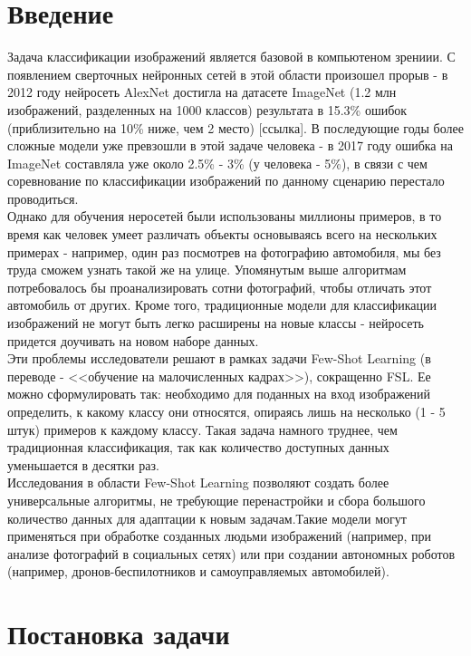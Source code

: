 \documentclass[a4paper, 12pt]{report}
\begin{document}
	\tableofcontents

\chapter{Введение}

Задача классификации изображений является базовой в компьютеном зрениии. С появлением сверточных нейронных сетей в этой области произошел прорыв - в 2012 году нейросеть AlexNet достигла на датасете ImageNet (1.2 млн изображений, разделенных на 1000 классов) результата в 15.3\% ошибок (приблизительно на 10\% ниже, чем 2 место) [ссылка]. В последующие годы более сложные модели уже превзошли в этой задаче человека - в 2017 году ошибка на ImageNet составляла уже около 2.5\% - 3\% (у человека - 5\%), в связи с чем соревнование по классификации изображений по данному сценарию перестало проводиться. \\

Однако для обучения неросетей были использованы миллионы примеров, в то время как человек умеет различать объекты основываясь всего на нескольких примерах - например, один раз посмотрев на фотографию автомобиля, мы без труда сможем узнать такой же на улице. Упомянутым выше алгоритмам потребовалось бы проанализировать сотни фотографий, чтобы отличать этот автомобиль от других. Кроме того, традиционные модели для классификации изображений не могут быть легко расширены на новые классы - нейросеть придется доучивать на новом наборе данных. \\

Эти проблемы исследователи решают в рамках задачи Few-Shot Learning (в переводе - <<обучение на малочисленных кадрах>>), сокращенно FSL. Ее можно сформулировать так: необходимо для поданных на вход изображений определить, к какому классу они относятся, опираясь лишь на несколько (1 - 5 штук) примеров к каждому классу. Такая задача намного труднее, чем традиционная классификация, так как количество доступных данных уменьшается в десятки раз. \\

Исследования в области Few-Shot Learning позволяют создать более универсальные алгоритмы, не требующие перенастройки и сбора большого количество данных для адаптации к новым задачам.Такие модели могут применяться при обработке созданных людьми изображений (например, при анализе фотографий в социальных сетях) или при создании автономных роботов (например, дронов-беспилотников и самоуправляемых автомобилей).

\chapter{Постановка задачи}
\end{document}
